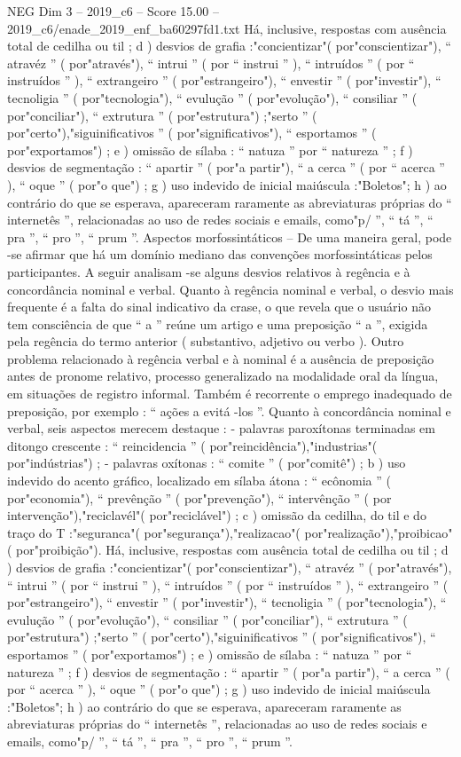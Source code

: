 \begin{textsample}{NEG Dim 3 – 2019\_c6 – Score 15.00 – 2019\_c6/enade\_2019\_enf\_ba60297fd1.txt}
Há, inclusive, respostas com ausência total de cedilha ou til ; d ) desvios de grafia :"concientizar"( por"conscientizar"), “ atravéz ” ( por"através"), “ intrui ” ( por “ instrui ” ), “ intruídos ” ( por “ instruídos ” ), “ extrangeiro ” ( por"estrangeiro"), “ envestir ” ( por"investir"), “ tecnoligia ” ( por"tecnologia"), “ evulução ” ( por"evolução"), “ consiliar ” ( por"conciliar"), “ extrutura ” ( por"estrutura") ;"serto ” ( por"certo"),"siguinificativos ” ( por"significativos"), “ esportamos ” ( por"exportamos") ; e ) omissão de sílaba : “ natuza ” por “ natureza ” ; f ) desvios de segmentação : “ apartir ” ( por"a partir"), “ a cerca ” ( por “ acerca ” ), “ oque ” ( por"o que") ; g ) uso indevido de inicial maiúscula :"Boletos"; h ) ao contrário do que se esperava, apareceram raramente as abreviaturas próprias do “ internetês ”, relacionadas ao uso de redes sociais e emails, como"p/ ”, “ tá ”, “ pra ”, “ pro ”, “ prum ”.
Aspectos morfossintáticos – De uma maneira geral, pode -se afirmar que há um domínio mediano das convenções morfossintáticas pelos participantes.
A seguir analisam -se alguns desvios relativos à regência e à concordância nominal e verbal.
Quanto à regência nominal e verbal, o desvio mais frequente é a falta do sinal indicativo da crase, o que revela que o usuário não tem consciência de que “ a ” reúne um artigo e uma preposição “ a ”, exigida pela regência do termo anterior ( substantivo, adjetivo ou verbo ).
Outro problema relacionado à regência verbal e à nominal é a ausência de preposição antes de pronome relativo, processo generalizado na modalidade oral da língua, em situações de registro informal.
Também é recorrente o emprego inadequado de preposição, por exemplo : “ ações a evitá -los ”.
Quanto à concordância nominal e verbal, seis aspectos merecem destaque : - palavras paroxítonas terminadas em ditongo crescente : “ reincidencia ” ( por"reincidência"),"industrias"( por"indústrias") ; - palavras oxítonas : “ comite ” ( por"comitê") ; b ) uso indevido do acento gráfico, localizado em sílaba átona : “ ecônomia ” ( por"economia"), “ prevênção ” ( por"prevenção"), “ intervênção ” ( por intervenção"),"reciclavél"( por"reciclável") ; c ) omissão da cedilha, do til e do traço do T :"seguranca"( por"segurança"),"realizacao"( por"realização"),"proibicao"( por"proibição").
Há, inclusive, respostas com ausência total de cedilha ou til ; d ) desvios de grafia :"concientizar"( por"conscientizar"), “ atravéz ” ( por"através"), “ intrui ” ( por “ instrui ” ), “ intruídos ” ( por “ instruídos ” ), “ extrangeiro ” ( por"estrangeiro"), “ envestir ” ( por"investir"), “ tecnoligia ” ( por"tecnologia"), “ evulução ” ( por"evolução"), “ consiliar ” ( por"conciliar"), “ extrutura ” ( por"estrutura") ;"serto ” ( por"certo"),"siguinificativos ” ( por"significativos"), “ esportamos ” ( por"exportamos") ; e ) omissão de sílaba : “ natuza ” por “ natureza ” ; f ) desvios de segmentação : “ apartir ” ( por"a partir"), “ a cerca ” ( por “ acerca ” ), “ oque ” ( por"o que") ; g ) uso indevido de inicial maiúscula :"Boletos"; h ) ao contrário do que se esperava, apareceram raramente as abreviaturas próprias do “ internetês ”, relacionadas ao uso de redes sociais e emails, como"p/ ”, “ tá ”, “ pra ”, “ pro ”, “ prum ”.

\end{textsample}
